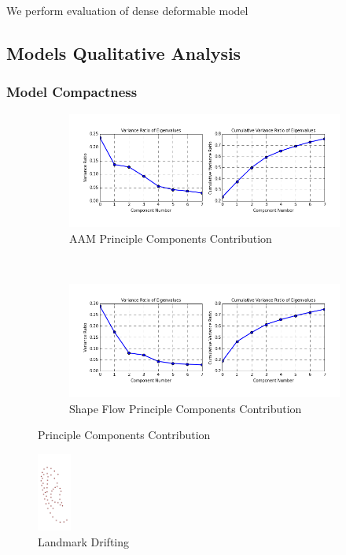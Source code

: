 We perform evaluation of dense deformable model

\subsection{Models Qualitative Analysis}


\subsubsection{Model Compactness}

\begin{figure}[h!]
    \centering
    \begin{subfigure}[b]{0.2\textwidth}
            \includegraphics[width=\textwidth]{resources/aam_ear_eigen_value}
        \caption{AAM Principle Components Contribution}
        \label{}
    \end{subfigure}
    ~~
    \begin{subfigure}[b]{0.2\textwidth}
            \includegraphics[width=\textwidth]{resources/of_ear_eigen_value}
        \caption{Shape Flow Principle Components Contribution}
    \end{subfigure}
    \caption{Principle Components Contribution}
\end{figure}

\begin{figure}[h!]
    \centering
    \includegraphics[width=0.1\textwidth]{resources/landmark_drifting}
    \caption{Landmark Drifting}
\end{figure}

